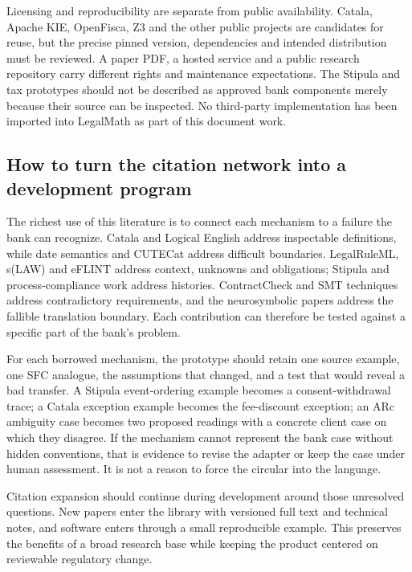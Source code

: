 Licensing and reproducibility are separate from public availability. Catala,
Apache KIE, OpenFisca, Z3 and the other public projects are candidates for reuse,
but the precise pinned version, dependencies and intended distribution must be
reviewed. A paper PDF, a hosted service and a public research repository carry
different rights and maintenance expectations. The Stipula and tax prototypes
should not be described as approved bank components merely because their source
can be inspected. No third-party implementation has been imported into LegalMath
as part of this document work.

\subsection{How to turn the citation network into a development program}

The richest use of this literature is to connect each mechanism to a failure the
bank can recognize. Catala and Logical English address inspectable definitions,
while date semantics and CUTECat address difficult boundaries. LegalRuleML,
s(LAW) and eFLINT address context, unknowns and obligations; Stipula and
process-compliance work address histories. ContractCheck and SMT techniques
address contradictory requirements, and the neurosymbolic papers address the
fallible translation boundary. Each contribution can therefore be tested against
a specific part of the bank's problem.

For each borrowed mechanism, the prototype should retain one source example,
one SFC analogue, the assumptions that changed, and a test that would reveal a
bad transfer. A Stipula event-ordering example becomes a consent-withdrawal trace;
a Catala exception example becomes the fee-discount exception; an ARc ambiguity
case becomes two proposed readings with a concrete client case on which they
disagree. If the mechanism cannot represent the bank case without hidden
conventions, that is evidence to revise the adapter or keep the case under human
assessment. It is not a reason to force the circular into the language.

Citation expansion should continue during development around those unresolved
questions. New papers enter the library with versioned full text and technical
notes, and software enters through a small reproducible example. This preserves
the benefits of a broad research base while keeping the product centered on
reviewable regulatory change.
